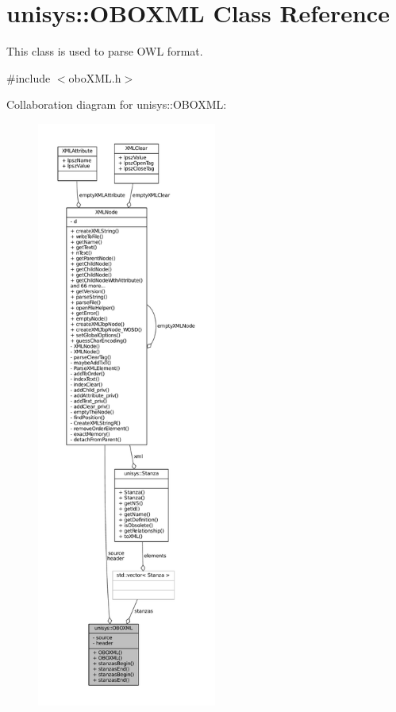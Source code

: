 \hypertarget{classunisys_1_1OBOXML}{\section{unisys\-:\-:O\-B\-O\-X\-M\-L Class Reference}
\label{classunisys_1_1OBOXML}
}


This class is used to parse O\-W\-L format.  




{\ttfamily \#include $<$obo\-X\-M\-L.\-h$>$}



Collaboration diagram for unisys\-:\-:O\-B\-O\-X\-M\-L\-:
\nopagebreak
\begin{figure}[H]
\begin{center}
\leavevmode
\includegraphics[height=550pt]{classunisys_1_1OBOXML__coll__graph}
\end{center}
\end{figure}
